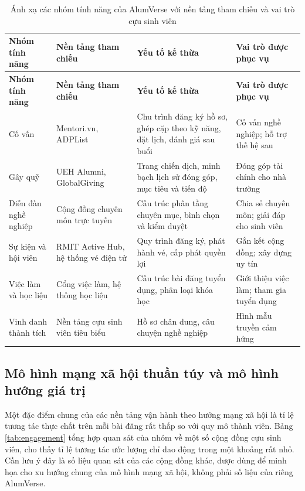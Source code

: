 \documentclass[12pt,a4paper,oneside]{report}
\begin{document}
\renewcommand{\arraystretch}{1.2}
\begin{longtable}{|>{\raggedright\arraybackslash}p{2.9cm}|>{\raggedright\arraybackslash}p{3.3cm}|>{\raggedright\arraybackslash}p{4.4cm}|>{\raggedright\arraybackslash}p{4.0cm}|}
\caption{Ánh xạ các nhóm tính năng của AlumVerse với nền tảng tham chiếu và vai trò cựu sinh viên}\label{tab:mapping}\\
\hline \textbf{Nhóm tính năng} & \textbf{Nền tảng tham chiếu} & \textbf{Yếu tố kế thừa} & \textbf{Vai trò được phục vụ} \\ \hline
\endfirsthead
\hline \textbf{Nhóm tính năng} & \textbf{Nền tảng tham chiếu} & \textbf{Yếu tố kế thừa} & \textbf{Vai trò được phục vụ} \\ \hline
\endhead
Cố vấn & Mentori.vn, ADPList & Chu trình đăng ký hồ sơ, ghép cặp theo kỹ năng, đặt lịch, đánh giá sau buổi & Cố vấn nghề nghiệp; hỗ trợ thế hệ sau \\ \hline
Gây quỹ & UEH Alumni, GlobalGiving & Trang chiến dịch, minh bạch lịch sử đóng góp, mục tiêu và tiến độ & Đóng góp tài chính cho nhà trường \\ \hline
Diễn đàn nghề nghiệp & Cộng đồng chuyên môn trực tuyến & Cấu trúc phân tầng chuyên mục, bình chọn và kiểm duyệt & Chia sẻ chuyên môn; giải đáp cho sinh viên \\ \hline
Sự kiện và hội viên & RMIT Active Hub, hệ thống vé điện tử & Quy trình đăng ký, phát hành vé, cấp phát quyền lợi & Gắn kết cộng đồng; xây dựng uy tín \\ \hline
Việc làm và học liệu & Cổng việc làm, hệ thống học liệu & Cấu trúc bài đăng tuyển dụng, phân loại khóa học & Giới thiệu việc làm; tham gia tuyển dụng \\ \hline
Vinh danh thành tích & Nền tảng cựu sinh viên tiêu biểu & Hồ sơ chân dung, câu chuyện nghề nghiệp & Hình mẫu truyền cảm hứng \\ \hline
\end{longtable}
\renewcommand{\arraystretch}{1}

\subsection{Mô hình mạng xã hội thuần túy và mô hình hướng giá trị}

Một đặc điểm chung của các nền tảng vận hành theo hướng mạng xã hội là tỉ lệ tương tác thực chất trên mỗi bài đăng rất thấp so với quy mô thành viên. Bảng \ref{tab:engagement} tổng hợp quan sát của nhóm về một số cộng đồng cựu sinh viên, cho thấy tỉ lệ tương tác ước lượng chỉ dao động trong một khoảng rất nhỏ. Cần lưu ý đây là số liệu quan sát của các cộng đồng khác, được dùng để minh họa cho xu hướng chung của mô hình mạng xã hội, không phải số liệu của riêng AlumVerse.
\end{document}
